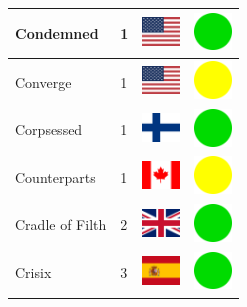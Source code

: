 \documentclass[12pt, a4paper, twoside]{report}
\begin{document}
\begin{center}
\begin{longtable}{|p{5cm}|p{2cm}|p{2cm}|p{2cm}|}
			Condemned & 1 & \includegraphics[width=1cm]{4x3/us} & \includegraphics[width=1cm]{likes/y} \\ \hline
			Converge & 1 & \includegraphics[width=1cm]{4x3/us} & \includegraphics[width=1cm]{likes/m} \\ \hline
			Corpsessed & 1 & \includegraphics[width=1cm]{4x3/fi} & \includegraphics[width=1cm]{likes/y} \\ \hline
			Counterparts & 1 & \includegraphics[width=1cm]{4x3/ca} & \includegraphics[width=1cm]{likes/m} \\ \hline
			Cradle of Filth & 2 & \includegraphics[width=1cm]{4x3/gb} & \includegraphics[width=1cm]{likes/y} \\ \hline
			Crisix & 3 & \includegraphics[width=1cm]{4x3/es} & \includegraphics[width=1cm]{likes/y} \\ \hline

\end{longtable}
\end{center}
\end{document}
